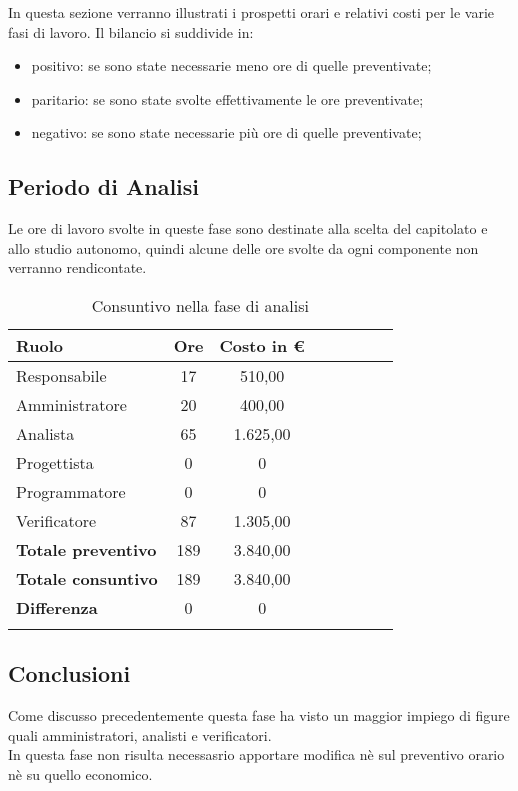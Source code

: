 \documentclass[../piano_di_progetto.tex]{subfiles}
\begin{document}
In questa sezione verranno illustrati i prospetti orari e relativi costi per le varie fasi di lavoro. Il bilancio si suddivide in:
\begin{itemize}
\item positivo: se sono state necessarie meno ore di quelle preventivate;
\item paritario: se sono state svolte effettivamente le ore preventivate;
\item negativo: se sono state necessarie più ore di quelle preventivate;
\end{itemize}

\subsection{ Periodo di Analisi}%
\label{sub:cons_analisi}
Le ore di lavoro svolte in queste fase sono destinate alla scelta del capitolato e allo studio autonomo, quindi alcune delle ore svolte da ogni componente non verranno rendicontate.

\begin{center}
	\begin{longtable}{|l|c|c|c|c|c|c|c|}
		\hline
		\rowcolor{lightgray}
		\textbf{Ruolo} & \textbf{Ore} & \textbf{Costo in €}\\
		\hline
		Responsabile & 17 & 510,00 \\
		\hline
		Amministratore & 20 & 400,00 \\
		\hline
		Analista & 65 & 1.625,00 \\
		\hline
		Progettista & 0 & 0 \\
		\hline
		Programmatore & 0 & 0 \\
		\hline
		Verificatore & 87 & 1.305,00 \\
		\hline
		\textbf{Totale preventivo} & 189 & 3.840,00 \\
		\hline
		\textbf{Totale consuntivo} & 189 & 3.840,00 \\
		\hline
		\textbf{Differenza} & 0 & 0\\
		\hline	
		\caption{Consuntivo nella fase di analisi}
	\end{longtable}
\end{center}

\subsection{ Conclusioni}%
\label{sub:cons_fine}
Come discusso precedentemente questa fase ha visto un maggior impiego di figure quali amministratori, analisti e verificatori.\\

In questa fase non risulta necessasrio apportare modifica nè sul preventivo orario nè su quello economico. 
\end{document}
